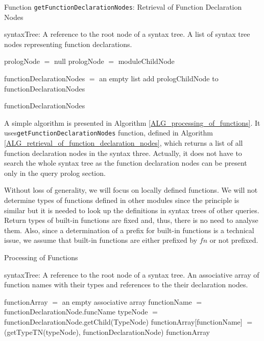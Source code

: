 \begin{algorithm}
\caption{Function \texttt{getFunctionDeclarationNodes}: Retrieval of Function Declaration Nodes}
\label{ALG_retrieval_of_function_declaration_nodes}
\begin{algorithmic}[1]
\REQUIRE syntaxTree: A reference to the root node of a syntax tree.
\ENSURE A list of syntax tree nodes representing function declarations.

\STATE prologNode $=$ null
        \STATE prologNode $=$ moduleChildNode
    \ENDIF
\ENDFOR

\STATE functionDeclarationNodes $=$ an empty list
            \STATE add prologChildNode to functionDeclarationNodes
        \ENDIF
    \ENDFOR
\ENDIF

\RETURN functionDeclarationNodes
\end{algorithmic}
\end{algorithm}

A simple algorithm is presented in Algorithm \ref{ALG_processing_of_functions}. It uses\linebreak \texttt{getFunctionDeclarationNodes} function, defined in Algorithm \ref{ALG_retrieval_of_function_declaration_nodes}, which returns a list of all function declaration nodes in the syntax three. Actually, it does not have to search the whole syntax tree as the function declaration nodes can be present only in the query prolog section. 

Without loss of generality, we will focus on locally defined functions. We will not determine types of functions defined in other modules since the principle is similar but it is needed to look up the definitions in syntax trees of other queries. Return types of built-in functions are fixed and, thus, there is no need to analyse them. Also, since a determination of a prefix for built-in functions is a technical issue, we assume that built-in functions are either prefixed by $fn$ or not prefixed.

\begin{algorithm}
\caption{Processing of Functions}
\label{ALG_processing_of_functions}
\begin{algorithmic}[1]
\REQUIRE syntaxTree: A reference to the root node of a syntax tree.
\ENSURE An associative array of function names with their types and references to the their declaration nodes.

\STATE functionArray $=$ an empty associative array
    \STATE functionName $=$ functionDeclarationNode.funcName
    \STATE typeNode $=$ functionDeclarationNode.getChild(TypeNode)
    \STATE functionArray[functionName] $=$ \\ (getTypeTN(typeNode), functionDeclarationNode)
\ENDFOR
\RETURN functionArray
\end{algorithmic}
\end{algorithm}

